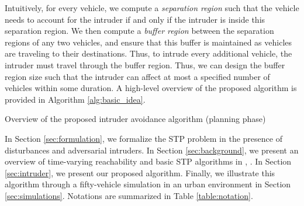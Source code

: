Intuitively, for every vehicle, we compute a \textit{separation region} such that the vehicle needs to account for the intruder if and only if the intruder is inside this separation region. We then compute a \textit{buffer region} between the separation regions of any two vehicles, and ensure that this buffer is maintained as vehicles are traveling to their destinations. Thus, to intrude every additional vehicle, the intruder must travel through the buffer region. Thus, we can design the buffer region size such that the intruder can affect at most a specified number of vehicles within some duration. A high-level overview of the proposed algorithm is provided in Algorithm \ref{alg:basic_idea}.    
%
\begin{algorithm}[tb]
	\DontPrintSemicolon
	\caption{Overview of the proposed intruder avoidance algorithm (planning phase)}
	\label{alg:basic_idea}
\end{algorithm}
%

In Section \ref{sec:formulation}, we formalize the STP problem in the presence of disturbances and adversarial intruders. In Section \ref{sec:background}, we present an overview of time-varying reachability and basic STP algorithms in \cite{Chen15c}, \cite{Bansal2017}. In Section \ref{sec:intruder}, we present our proposed algorithm. Finally, we illustrate this algorithm through a fifty-vehicle simulation in an urban environment in Section \ref{sec:simulations}. Notations are summarized in Table \ref{table:notation}.